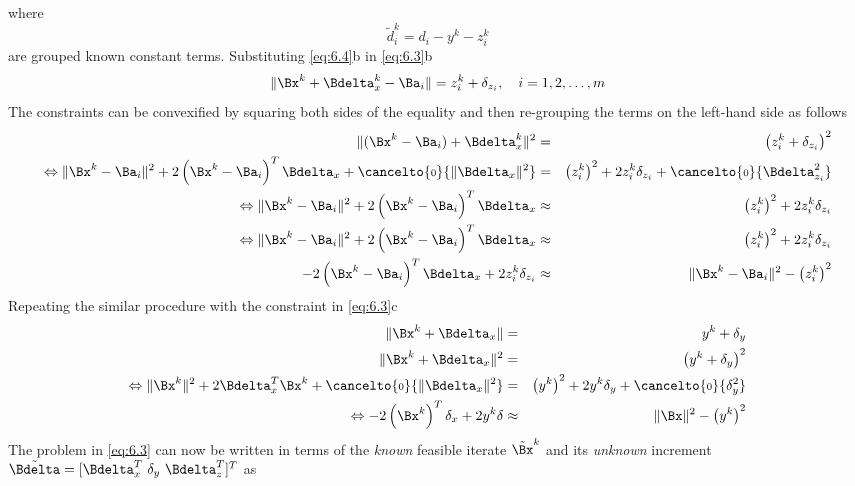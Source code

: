 where 
\begin{equation}
\nonumber
\tilde{d}^k_i =  d_i - y^k - z_i^k
\end{equation}
 are grouped known constant terms.
Substituting \ref{eq:6.4}b in \ref{eq:6.3}b
\begin{equation}
\nonumber
\|\Bx^k + \Bdelta^k_x - \Ba_i\| = z^k_i +\delta_{z_i}, \quad i = 1, 2, \ldots, m
\end{equation}
The constraints can be convexified by squaring both sides of the equality and then re-grouping the terms on the left-hand side as follows
\begin{eqnarray}
\nonumber
\|(\Bx^k  - \Ba_i) + \Bdelta^k_x\|^2 & = & \left(z^k_i +\delta_{z_i}\right)^2 \\
\nonumber
\Leftrightarrow 
\|\Bx^k  - \Ba_i\|^2 + 2\left( \Bx^k  - \Ba_i \right)^T\Bdelta_x + \cancelto{\mbox{\scriptsize{0}}}{\|\Bdelta_x\|^2}  & = & \left(z_i^k\right)^2 + 2z_i^k\delta_{z_i} + \cancelto{\mbox{\scriptsize{0}}}{\Bdelta^2_{z_i}} \\
\nonumber
\Leftrightarrow \|\Bx^k  - \Ba_i\|^2 + 2\left( \Bx^k  - \Ba_i \right)^T\Bdelta_x   & \approx & \left(z_i^k\right)^2 + 2z_i^k\delta_{z_i} \\
\nonumber
\Leftrightarrow \|\Bx^k  - \Ba_i\|^2 + 2\left( \Bx^k  - \Ba_i \right)^T\Bdelta_x   & \approx & \left(z_i^k\right)^2 + 2z_i^k\delta_{z_i} \\
\nonumber
- 2\left( \Bx^k  - \Ba_i \right)^T\Bdelta_x + 2z_i^k\delta_{z_i}  & \approx & \|\Bx^k  - \Ba_i\|^2 - \left(z_i^k\right)^2
\end{eqnarray}
Repeating the similar procedure with the constraint in \ref{eq:6.3}c
\begin{eqnarray}
\nonumber
\|\Bx^k + \Bdelta_x\| & = & y^k + \delta_y \\
\nonumber
\|\Bx^k + \Bdelta_x\|^2 & = & \left(y^k + \delta_y \right)^2 \\
\nonumber
\Leftrightarrow \|\Bx^k\|^2 + 2\Bdelta_x^T\Bx^k + \cancelto{\mbox{\scriptsize{0}}}{\|\Bdelta_x\|^2} & = & \left(y^k\right)^2 + 2y^k\delta_y +  \cancelto{\mbox{\scriptsize{0}}}{\delta_y^2} \\
\nonumber
\Leftrightarrow -2\left(\Bx^k\right)^T\delta_x + 2y^k\delta & \approx & \|\Bx\|^2 - \left(y^k\right)^2
\end{eqnarray}
The problem in \ref{eq:6.3} can now be written in terms of the \textit{known} feasible  iterate $\tilde{\Bx}^k$ and its \textit{unknown} increment  $\tilde{\Bdelta} = [\Bdelta_x^T \  \delta_y \ \Bdelta_{z}^T]^T$ as
\setcounter{abc}{0}
